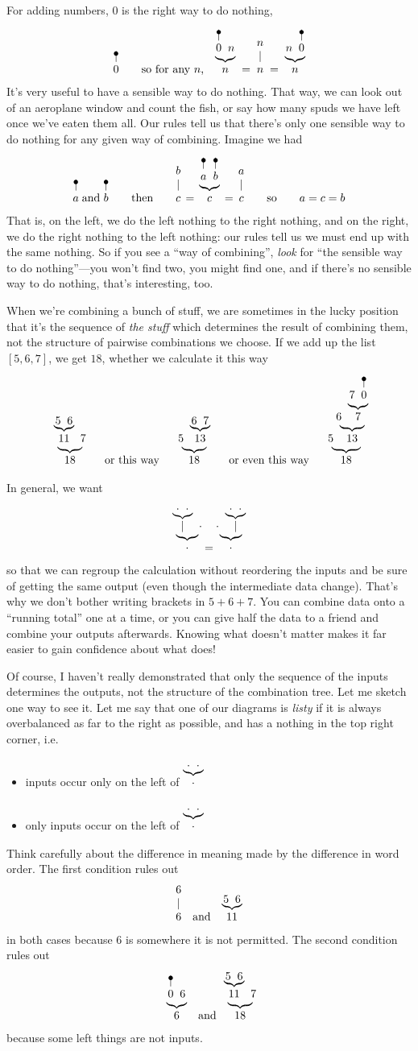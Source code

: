 \documentclass{book}
\begin{document}
For adding numbers, 0 is the right way to do nothing,
\[
\naw{0}
\qquad\mbox{so for any $n$,}\quad
\wye{\naw{0}}nn \;=\; \wid n \;=\;\wye n{\naw{0}}n
\]
It's very useful to have a sensible way to do nothing. That way, we can look out of an aeroplane window and count the fish, or say how many spuds we have left once we've eaten them all. Our rules tell us that there's only one sensible way to do nothing for any given way of combining. Imagine we had
\[
\naw{a} \; \mbox{and}\; \naw{b}
\qquad\mbox{then}\qquad
\wir bc\,=\,\wye{\naw{a}}{\naw{b}}c\,=\,\wir ac
\qquad\mbox{so}\qquad a = c = b
\]
That is, on the left, we do the left nothing to the right nothing, and on the right, we do the right nothing to the left nothing: our rules tell us we must end up with the same nothing. So if you see a ``way of combining'', \emph{look} for ``the sensible way to do nothing''---you won't find two, you might find one, and if there's no sensible way to do nothing, that's interesting, too.

When we're combining a bunch of stuff, we are sometimes in the lucky position that it's the sequence of \emph{the stuff} which determines the result of combining them, not the structure of pairwise combinations we choose. If we add up the list $[5,6,7]$, we get $18$, whether we calculate it this way
\[
\wye{\wye56{11}}7{18}
\qquad\mbox{or this way}\qquad
\wye5{\wye67{13}}{18}
\qquad\mbox{or even this way}\qquad
\wye5{\wye6{\wye7{\naw0}7}{13}}{18}
\]

In general, we want
\[
\wye{\wye\cdot\cdot\mid}\cdot\cdot \;=\; \wye\cdot{\wye\cdot\cdot\mid}\cdot
\]
so that we can regroup the calculation without reordering the inputs and be sure of getting the same output (even though the intermediate data change). That's why we don't bother writing brackets in $5+6+7$. You can combine data onto a ``running total'' one at a time, or you can give half the data to a friend and combine your outputs afterwards. Knowing what doesn't matter makes it far easier to gain confidence about what does!

Of course, I haven't really demonstrated that only the sequence of the inputs determines the outputs, not the structure of the combination tree. Let me sketch one way to see it. Let me say that one of our diagrams is \emph{listy} if it is always overbalanced as far to the right as possible, and has a nothing in the top right corner, i.e.
\begin{itemize}
\item inputs occur only on the left of $\wye\cdot\cdot\cdot$
\item only inputs occur on the left of $\wye\cdot\cdot\cdot$
\end{itemize}
Think carefully about the difference in meaning made by the difference in word order. The first condition rules out
\[
\wid 6 \quad\mbox{and}\quad \wye56{11}
\]
in both cases because $6$ is somewhere it is not permitted.
The second condition rules out
\[
\wye{\naw0}66 \quad\mbox{and}\quad \wye{\wye56{11}}7{18}
\]
because some left things are not inputs.
\end{document}
